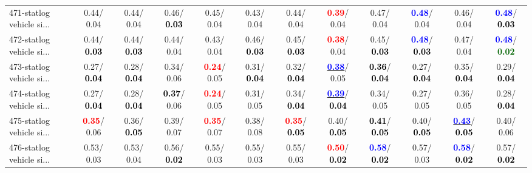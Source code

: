 \begin{table}[h]
\begin{center}
{\begin{tabular}{lc|c|c|c|c|c|c|c|c|c|c}
471-statlog vehicle si... &   0.44/  0.04 &   0.44/  0.04 &   0.46/\textcolor{black}{\textbf{  0.03}} &   0.45/  0.04 &   0.43/  0.04 &   0.44/  0.04 & \textcolor{red}{\textbf{  0.39}}/  0.04 &   0.47/  0.04 & \textcolor{blue}{\textbf{  0.48}}/  0.04 &   0.46/  0.04 & \textcolor{blue}{\textbf{  0.48}}/\textcolor{black}{\textbf{  0.03}} \\
472-statlog vehicle si... &   0.44/\textcolor{black}{\textbf{  0.03}} &   0.44/\textcolor{black}{\textbf{  0.03}} &   0.44/  0.04 &   0.43/  0.04 &   0.46/\textcolor{black}{\textbf{  0.03}} &   0.45/\textcolor{black}{\textbf{  0.03}} & \textcolor{red}{\textbf{  0.38}}/  0.04 &   0.45/\textcolor{black}{\textbf{  0.03}} & \textcolor{blue}{\textbf{  0.48}}/\textcolor{black}{\textbf{  0.03}} &   0.47/  0.04 & \textcolor{blue}{\textbf{  0.48}}/\textcolor{darkgreen}{\textbf{  0.02}} \\
473-statlog vehicle si... &   0.27/\textcolor{black}{\textbf{  0.04}} &   0.28/\textcolor{black}{\textbf{  0.04}} &   0.34/  0.06 & \textcolor{red}{\textbf{  0.24}}/  0.05 &   0.31/\textcolor{black}{\textbf{  0.04}} &   0.32/\textcolor{black}{\textbf{  0.04}} & \underline{\textcolor{blue}{\textbf{  0.38}}}/  0.05 & \textcolor{black}{\textbf{  0.36}}/\textcolor{black}{\textbf{  0.04}} &   0.27/\textcolor{black}{\textbf{  0.04}} &   0.35/\textcolor{black}{\textbf{  0.04}} &   0.29/\textcolor{black}{\textbf{  0.04}} \\
474-statlog vehicle si... &   0.27/\textcolor{black}{\textbf{  0.04}} &   0.28/\textcolor{black}{\textbf{  0.04}} & \textcolor{black}{\textbf{  0.37}}/  0.06 & \textcolor{red}{\textbf{  0.24}}/  0.05 &   0.31/  0.05 &   0.34/\textcolor{black}{\textbf{  0.04}} & \underline{\textcolor{blue}{\textbf{  0.39}}}/\textcolor{black}{\textbf{  0.04}} &   0.34/  0.05 &   0.27/  0.05 &   0.36/  0.05 &   0.28/\textcolor{black}{\textbf{  0.04}} \\
475-statlog vehicle si... & \textcolor{red}{\textbf{  0.35}}/  0.06 &   0.36/\textcolor{black}{\textbf{  0.05}} &   0.39/  0.07 & \textcolor{red}{\textbf{  0.35}}/  0.07 &   0.38/  0.08 & \textcolor{red}{\textbf{  0.35}}/\textcolor{black}{\textbf{  0.05}} &   0.40/\textcolor{black}{\textbf{  0.05}} & \textcolor{black}{\textbf{  0.41}}/\textcolor{black}{\textbf{  0.05}} &   0.40/\textcolor{black}{\textbf{  0.05}} & \underline{\textcolor{blue}{\textbf{  0.43}}}/\textcolor{black}{\textbf{  0.05}} &   0.40/  0.06 \\
476-statlog vehicle si... &   0.53/  0.03 &   0.53/  0.04 &   0.56/\textcolor{black}{\textbf{  0.02}} &   0.55/  0.03 &   0.55/  0.03 &   0.55/  0.03 & \textcolor{red}{\textbf{  0.50}}/\textcolor{black}{\textbf{  0.02}} & \textcolor{blue}{\textbf{  0.58}}/\textcolor{black}{\textbf{  0.02}} &   0.57/  0.03 & \textcolor{blue}{\textbf{  0.58}}/\textcolor{black}{\textbf{  0.02}} &   0.57/\textcolor{black}{\textbf{  0.02}} \\ \hline

\end{tabular}}
\end{center}
\end{table}
